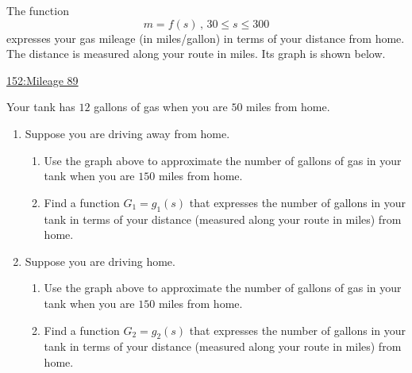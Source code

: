 \documentclass{ximera}
\begin{document}
\begin{question} \label{QKDfer3fr}

 
The function
\[
 m=f(s) \, , \, 30\leq s \leq 300
\]
expresses your gas mileage (in miles/gallon) in terms of your distance from home. The distance is measured along your route in miles. Its graph is shown below.

\begin{onlineOnly}
    \begin{center}
\end{center}
\end{onlineOnly}

\href{https://www.desmos.com/calculator/v34aycmz93}{152:Mileage 89}



Your tank has $12$ gallons of gas when you are $50$ miles from home.

\begin{enumerate}
\item Suppose you are driving away from home. 

\begin{enumerate}

\item Use the graph above to approximate the number of gallons of gas in your tank when you are $150$ miles from home.

\item Find a function $G_1 = g_1(s)$ that expresses the number of gallons in your tank in terms of your distance (measured along your route in miles) from home.

\end{enumerate}

\item Suppose you are driving home. 

\begin{enumerate}

\item Use the graph above to approximate the number of gallons of gas in your tank when you are $150$ miles from home.

\item Find a function $G_2 = g_2(s)$ that expresses the number of gallons in your tank in terms of your distance (measured along your route in miles) from home.


\end{enumerate}

\end{enumerate}


\end{question}
\end{document}
